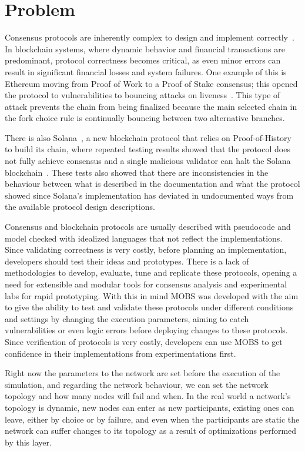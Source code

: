 \section{Problem}\label{sub:problem}
Consensus protocols are inherently complex to design and implement correctly~\cite{paxos, have_we_reached_consensus}.
In blockchain systems, where dynamic behavior and financial transactions are predominant, protocol correctness becomes critical,
as even minor errors can result in significant financial losses and system failures. One example of this is Ethereum moving from 
Proof of Work to a Proof of Stake consensus; this opened the protocol to vulnerabilities to bouncing attacks on liveness~\cite{ethereum_analysis}.
This type of attack prevents the chain from being finalized because the main selected chain in the fork choice rule
is continually bouncing between two alternative branches.

There is also Solana~\cite{solana}, a new blockchain protocol that relies on Proof-of-History to build its chain,
where repeated testing results showed that the protocol does not fully achieve consensus and
a single malicious validator can halt the Solana blockchain~\cite{solana_halting_problem}. These tests also showed that there are
inconsistencies in the behaviour between what is described in the documentation and what the protocol showed since Solana's implementation
has deviated in undocumented ways from the available protocol design descriptions.

Consensus and blockchain protocols are usually described with pseudocode and model checked with idealized languages that 
not reflect the implementations. Since validating correctness is very costly\cite{desidn_and_validation}, before planning an
implementation, developers should test their ideas and prototypes. There is a lack of methodologies to develop,
evaluate, tune and replicate these protocols, opening a need for extensible and modular tools for consensus analysis and
experimental labs for rapid prototyping.
With this in mind MOBS was developed with the aim to give the ability to test and validate these protocols under different conditions and settings by 
changing the execution parameters, aiming to catch vulnerabilities or even logic errors before deploying changes to these protocols.
Since verification of protocols is very costly, developers can use MOBS to get confidence in their implementations
from experimentations first.

Right now the parameters to the network are set before the execution of the simulation, and regarding the network behaviour, we can
set the network topology and how many nodes will fail and when. In the real world a network's topology is dynamic, new nodes can enter
as new participants, existing ones can leave, either by choice or by failure, and even when the participants are static the network
can suffer changes to its topology as a result of optimizations performed by this layer.

